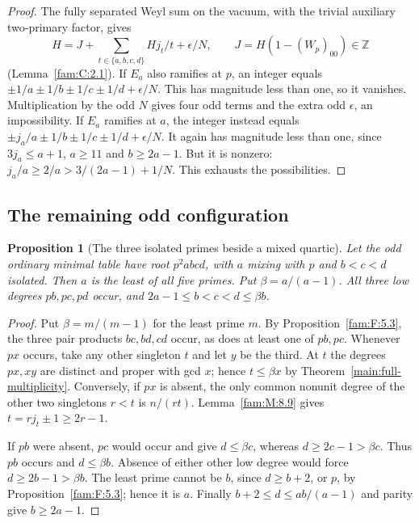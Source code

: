 \documentclass[11pt,a4paper]{article}
\numberwithin{equation}{section}
\newtheorem{proposition}[theorem]{Proposition}
\theoremstyle{remark}
\begin{document}
\begin{proof}
The fully separated Weyl sum on the vacuum, with the trivial
auxiliary two-primary factor, gives
\[
 H=J+\sum_{t\in\{a,b,c,d\}}Hj_t/t+\epsilon/N,\qquad
 J=H(1-(W_p)_{00})\in\mathbb Z
\]
(Lemma~\ref{fam:C:2.1}). If $E_a$ also ramifies at $p$, an integer
equals $\pm1/a\pm1/b\pm1/c\pm1/d+\epsilon/N$. This has magnitude
less than one, so it vanishes. Multiplication by the odd $N$ gives
four odd terms and the extra odd $\epsilon$, an impossibility.
If $E_a$ ramifies at $a$, the integer instead equals
$\pm j_a/a\pm1/b\pm1/c\pm1/d+\epsilon/N$. It again has magnitude
less than one, since $3j_a\le a+1$, $a\ge11$ and $b\ge2a-1$.
But it is nonzero: $j_a/a\ge2/a>3/(2a-1)+1/N$. This exhausts
the possibilities.
\end{proof}

\subsection{The remaining odd configuration}\label{fam:C:sec:4}

\begin{proposition}[The three isolated primes beside a mixed quartic]\label{fam:C:4.1}
Let the odd ordinary minimal table have root $p^2abcd$, with $a$
mixing with $p$ and $b<c<d$ isolated. Then $a$ is the least of
all five primes. Put $\beta=a/(a-1)$. All three low degrees
$pb,pc,pd$ occur, and $2a-1\le b<c<d\le\beta b$.

\end{proposition}
\begin{proof}
Put $\beta=m/(m-1)$ for the least prime $m$. By
Proposition~\ref{fam:F:5.3}, the three pair products $bc,bd,cd$
occur, as does at least one of $pb,pc$. Whenever $px$ occurs,
take any other singleton $t$ and let $y$ be the third. At $t$ the
degrees $px,xy$ are distinct and proper with gcd $x$; hence
$t\le\beta x$ by Theorem~\ref{main:full-multiplicity}.
Conversely, if $px$ is absent, the only common nonunit degree of
the other two singletons $r<t$ is $n/(rt)$. Lemma~\ref{fam:M:8.9}
gives $t=rj_t\pm1\ge2r-1$.

If $pb$ were absent, $pc$ would occur and give $d\le\beta c$,
whereas $d\ge2c-1>\beta c$. Thus $pb$ occurs and $d\le\beta b$.
Absence of either other low degree would force $d\ge2b-1>\beta b$.
The least prime cannot be $b$, since $d\ge b+2$, or $p$, by
Proposition~\ref{fam:F:5.3}; hence it is $a$. Finally
$b+2\le d\le ab/(a-1)$ and parity give $b\ge2a-1$.

\end{proof}
\end{document}
